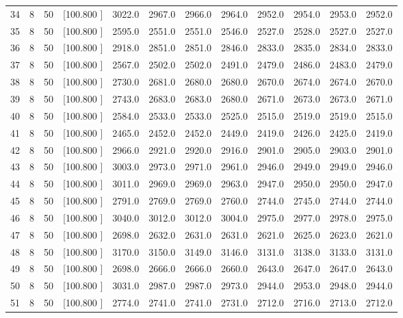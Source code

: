 \documentclass[12pt,a4paper]{article}
\begin{document}
\begin{center}
{\begin{tabular}{r r r r r r r r r r r r}
  34&  8& 50&[100.800   ]&  3022.0&  2967.0&  2966.0&  2964.0&  2952.0&  2954.0&  2953.0&  2952.0\\[-0.02in]
  35&  8& 50&[100.800   ]&  2595.0&  2551.0&  2551.0&  2546.0&  2527.0&  2528.0&  2527.0&  2527.0\\[-0.02in]
  36&  8& 50&[100.800   ]&  2918.0&  2851.0&  2851.0&  2846.0&  2833.0&  2835.0&  2834.0&  2833.0\\[-0.02in]
  37&  8& 50&[100.800   ]&  2567.0&  2502.0&  2502.0&  2491.0&  2479.0&  2486.0&  2483.0&  2479.0\\[-0.02in]
  38&  8& 50&[100.800   ]&  2730.0&  2681.0&  2680.0&  2680.0&  2670.0&  2674.0&  2674.0&  2670.0\\[-0.02in]
  39&  8& 50&[100.800   ]&  2743.0&  2683.0&  2683.0&  2680.0&  2671.0&  2673.0&  2673.0&  2671.0\\[-0.02in]
  40&  8& 50&[100.800   ]&  2584.0&  2533.0&  2533.0&  2525.0&  2515.0&  2519.0&  2519.0&  2515.0\\[-0.02in]
  41&  8& 50&[100.800   ]&  2465.0&  2452.0&  2452.0&  2449.0&  2419.0&  2426.0&  2425.0&  2419.0\\[-0.02in]
  42&  8& 50&[100.800   ]&  2966.0&  2921.0&  2920.0&  2916.0&  2901.0&  2905.0&  2903.0&  2901.0\\[-0.02in]
  43&  8& 50&[100.800   ]&  3003.0&  2973.0&  2971.0&  2961.0&  2946.0&  2949.0&  2949.0&  2946.0\\[-0.02in]
  44&  8& 50&[100.800   ]&  3011.0&  2969.0&  2969.0&  2963.0&  2947.0&  2950.0&  2950.0&  2947.0\\[-0.02in]
  45&  8& 50&[100.800   ]&  2791.0&  2769.0&  2769.0&  2760.0&  2744.0&  2745.0&  2744.0&  2744.0\\[-0.02in]
  46&  8& 50&[100.800   ]&  3040.0&  3012.0&  3012.0&  3004.0&  2975.0&  2977.0&  2978.0&  2975.0\\[-0.02in]
  47&  8& 50&[100.800   ]&  2698.0&  2632.0&  2631.0&  2631.0&  2621.0&  2625.0&  2623.0&  2621.0\\[-0.02in]
  48&  8& 50&[100.800   ]&  3170.0&  3150.0&  3149.0&  3146.0&  3131.0&  3138.0&  3133.0&  3131.0\\[-0.02in]
  49&  8& 50&[100.800   ]&  2698.0&  2666.0&  2666.0&  2660.0&  2643.0&  2647.0&  2647.0&  2643.0\\[-0.02in]
  50&  8& 50&[100.800   ]&  3031.0&  2987.0&  2987.0&  2973.0&  2944.0&  2953.0&  2948.0&  2944.0\\[-0.02in]
  51&  8& 50&[100.800   ]&  2774.0&  2741.0&  2741.0&  2731.0&  2712.0&  2716.0&  2713.0&  2712.0\\[-0.02in]

\end{tabular}}
\end{center}
\end{document}
